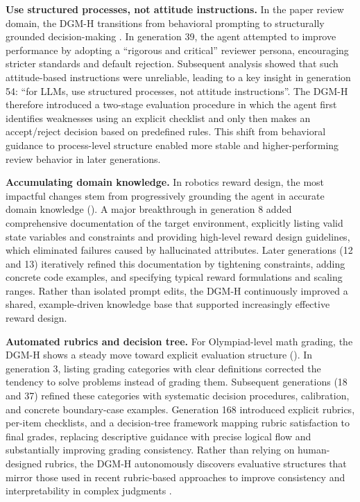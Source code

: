 \documentclass[]{fairmeta}
\begin{document}
\textbf{Use structured processes, not attitude instructions.} In the paper review domain, the DGM-H transitions from behavioral prompting to structurally grounded decision-making . In generation 39, the agent attempted to improve performance by adopting a ``rigorous and critical'' reviewer persona, encouraging stricter standards and default rejection. Subsequent analysis showed that such attitude-based instructions were unreliable, leading to a key insight in generation 54: ``for LLMs, use structured processes, not attitude instructions''. The DGM-H therefore introduced a two-stage evaluation procedure in which the agent first identifies weaknesses using an explicit checklist and only then makes an accept/reject decision based on predefined rules. This shift from behavioral guidance to process-level structure enabled more stable and higher-performing review behavior in later generations.

\textbf{Accumulating domain knowledge.} In robotics reward design, the most impactful changes stem from progressively grounding the agent in accurate domain knowledge (). A major breakthrough in generation 8 added comprehensive documentation of the target environment, explicitly listing valid state variables and constraints and providing high-level reward design guidelines, which eliminated failures caused by hallucinated attributes. Later generations (12 and 13) iteratively refined this documentation by tightening constraints, adding concrete code examples, and specifying typical reward formulations and scaling ranges. Rather than isolated prompt edits, the DGM-H continuously improved a shared, example-driven knowledge base that supported increasingly effective reward design.

\textbf{Automated rubrics and decision tree.} For Olympiad-level math grading, the DGM-H shows a steady move toward explicit evaluation structure (). In generation 3, listing grading categories with clear definitions corrected the tendency to solve problems instead of grading them. Subsequent generations (18 and 37) refined these categories with systematic decision procedures, calibration, and concrete boundary-case examples. Generation 168 introduced explicit rubrics, per-item checklists, and a decision-tree framework mapping rubric satisfaction to final grades, replacing descriptive guidance with precise logical flow and substantially improving grading consistency.
Rather than relying on human-designed rubrics, the DGM-H autonomously discovers evaluative structures that mirror those used in recent rubric-based approaches to improve consistency and interpretability in complex judgments \citep{cook2024ticking, fan2024sedareval, chen2026automated, lv2026rubrics}.
\end{document}
